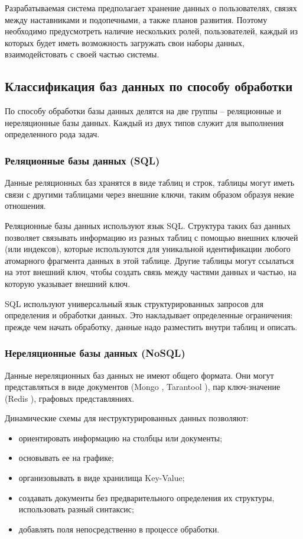 Разрабатываемая система предполагает хранение данных о пользователях, связях между наставниками и подопечными, а также планов развития.
Поэтому необходимо предусмотреть наличие нескольких ролей, пользователей, каждый из которых будет
иметь возможность загружать свои наборы данных, взаимодейстовать с своей частью системы.

\subsection{Классификация баз данных по способу обработки}

По способу обработки базы данных делятся на две группы -- реляционные и нереляционные базы данных. Каждый из двух типов служит для выполнения определенного рода задач.

\subsubsection{Реляционные базы данных (SQL)}

Данные реляционных баз хранятся в виде таблиц и строк, таблицы могут иметь связи с другими таблицами через внешние ключи, таким образом образуя некие отношения.

Реляционные базы данных используют язык SQL. Структура таких баз данных позволяет связывать информацию из разных таблиц с помощью внешних ключей (или индексов), которые используются для уникальной идентификации любого атомарного фрагмента данных в этой таблице. Другие таблицы могут ссылаться на этот внешний ключ, чтобы создать связь между частями данных и частью, на которую указывает внешний ключ.

SQL используют универсальный язык структурированных запросов для определения и обработки данных. Это накладывает определенные ограничения: прежде чем начать обработку, данные надо разместить внутри таблиц и описать.

\subsubsection{Нереляционные базы данных (NoSQL)}

Данные нереляционных баз данных не имеют общего формата. Они могут представляться в виде документов (Mongo \cite{mongodb}, Tarantool \cite{tarantool}), пар ключ-значение (Redis \cite{redis}), графовых представляниях.

Динамические схемы для неструктурированных данных позволяют:

\begin{itemize}
    \item ориентировать информацию на столбцы или документы;
    \item основывать ее на графике;
    \item организовывать в виде хранилища Key-Value;
    \item создавать документы без предварительного определения их структуры, использовать разный синтаксис;
    \item добавлять поля непосредственно в процессе обработки.
\end{itemize}

